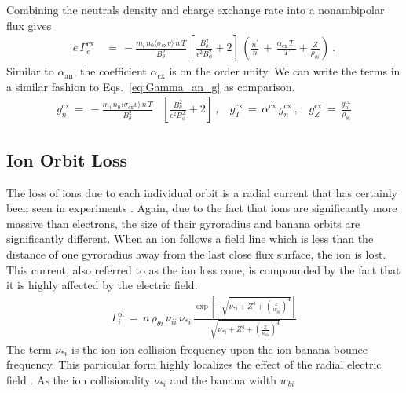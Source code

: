 Combining the neutrals density and charge exchange rate into a nonambipolar flux gives
\begin{align} %
	e\,\Gamma_e^\text{cx} \,&=\,
		-\frac{m_i \,n_0 \langle\sigma_\text{cx} v\rangle \, n\,T}{B_\theta^2}
		\, \left[\frac{B_\theta^2}{\epsilon^2 B_\phi^2} + 2\right] \,
		\left(\frac{n^\prime}{n} \,+\, \frac{\alpha_\text{cx}\,T^\prime}
		{T} + \frac{Z}{\rho_{\theta i}}\right)~. \label{eq:Gamma_cx}
\end{align}
Similar to $\alpha_\text{an}$, the coefficient $\alpha_\text{cx}$ is on the order unity.
We can write the terms in a similar fashion to Eqs.~\ref{eq:Gamma_an_g} as comparison.
\begin{align} %
	g_n^\text{cx} \,=\, -\frac{m_i \,n_0 \langle\sigma_\text{cx} v\rangle \, n \, T}
		{B_\theta^2}& \left[\frac{B_\theta^2}{\epsilon^2 B_\phi^2} + 2\right]
		~,~~~~ g_T^\text{cx} \,=\, \alpha^\text{cx}\,g_n^\text{cx}~,~~~~
		g_Z^\text{cx} \,=\, \frac{g_n^\text{cx}}{\rho_{\theta i}}
		\label{eq:g_cx}
\end{align}


\subsection{Ion Orbit Loss}\label{ssec:ol_loss}
The loss of ions due to each individual orbit is a radial current that has certainly been seen in experiments \cite{weisen_boundary_1991}.
Again, due to the fact that ions are significantly more massive than electrons, the size of their gyroradius and banana orbits are significantly different.
When an ion follows a field line which is less than the distance of one gyroradius away from the last close flux surface, the ion is lost.
This current, also referred to as the ion loss cone, is compounded by the fact that it is highly affected by the electric field.
\begin{align} %
	\Gamma_i^\text{ol} \,=\, n \, \rho_{\theta i} \, \nu_{ii} \, \nu_{*i} \,
		\frac{\exp\left[-\sqrt{\nu_{*i} + Z^4
		+ \left(\frac{x}{w_{bi}}\right)^4}\right]}{\sqrt{\nu_{*i} + Z^4
		+ \left(\frac{x}{w_{bi}}\right)^4}} \label{eq:Gamma_ol}
\end{align}
The term $\nu_{*i}$ is the ion-ion collision frequency upon the ion banana bounce frequency. %
This particular form highly localizes the effect of the radial electric field \cite{kobayashi_experimental_2016}.
As the ion collisionality $\nu_{*i}$ and the banana width $w_{bi}$

